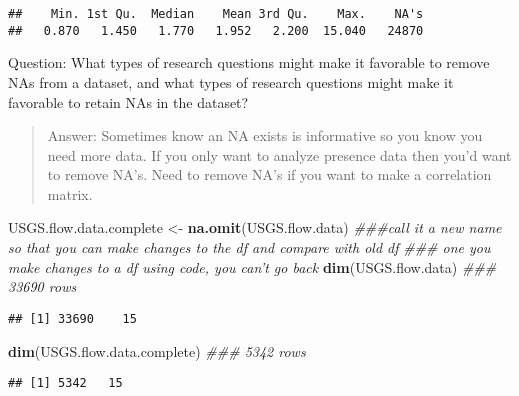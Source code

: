 \documentclass[]{article}
\newenvironment{Shaded}{\begin{snugshade}}{\end{snugshade}}
\newcommand{\CommentTok}[1]{\textcolor[rgb]{0.56,0.35,0.01}{\textit{#1}}}
\newcommand{\KeywordTok}[1]{\textcolor[rgb]{0.13,0.29,0.53}{\textbf{#1}}}
\newcommand{\NormalTok}[1]{#1}
\newcommand{\OperatorTok}[1]{\textcolor[rgb]{0.81,0.36,0.00}{\textbf{#1}}}
\newcommand{\StringTok}[1]{\textcolor[rgb]{0.31,0.60,0.02}{#1}}
\begin{document}
\begin{verbatim}
##    Min. 1st Qu.  Median    Mean 3rd Qu.    Max.    NA's 
##   0.870   1.450   1.770   1.952   2.200  15.040   24870
\end{verbatim}

Question: What types of research questions might make it favorable to
remove NAs from a dataset, and what types of research questions might
make it favorable to retain NAs in the dataset?

\begin{quote}
Answer: Sometimes know an NA exists is informative so you know you need
more data. If you only want to analyze presence data then you'd want to
remove NA's. Need to remove NA's if you want to make a correlation
matrix.
\end{quote}

\begin{Shaded}
\begin{Highlighting}[]
\NormalTok{USGS.flow.data.complete <-}\StringTok{ }\KeywordTok{na.omit}\NormalTok{(USGS.flow.data) }\CommentTok{###call it a new name so that you can make changes to the df and compare with old df }
\CommentTok{### one you make changes to a df using code, you can't go back }
\KeywordTok{dim}\NormalTok{(USGS.flow.data) }\CommentTok{### 33690 rows}
\end{Highlighting}
\end{Shaded}

\begin{verbatim}
## [1] 33690    15
\end{verbatim}

\begin{Shaded}
\begin{Highlighting}[]
\KeywordTok{dim}\NormalTok{(USGS.flow.data.complete) }\CommentTok{### 5342 rows}
\end{Highlighting}
\end{Shaded}

\begin{verbatim}
## [1] 5342   15
\end{verbatim}

\begin{Shaded}
\end{Shaded}
\end{document}
